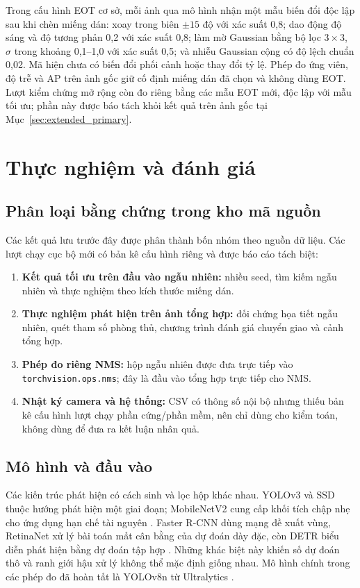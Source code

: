 \documentclass[a4paper,fleqn]{cas-dc}
\begin{document}
Trong cấu hình EOT cơ sở, mỗi ảnh qua mô hình nhận một mẫu biến đổi độc lập sau khi chèn miếng dán: xoay trong biên $\pm15$ độ với xác suất 0,8; dao động độ sáng và độ tương phản 0,2 với xác suất 0,8; làm mờ Gaussian bằng bộ lọc $3\times3$, $\sigma$ trong khoảng 0,1--1,0 với xác suất 0,5; và nhiễu Gaussian cộng có độ lệch chuẩn 0,02. Mã hiện chưa có biến đổi phối cảnh hoặc thay đổi tỷ lệ. Phép đo ứng viên, độ trễ và AP trên ảnh gốc giữ cố định miếng dán đã chọn và không dùng EOT. Lượt kiểm chứng mở rộng còn đo riêng bằng các mẫu EOT mới, độc lập với mẫu tối ưu; phần này được báo tách khỏi kết quả trên ảnh gốc tại Mục~\ref{sec:extended_primary}.

\section{Thực nghiệm và đánh giá}

\subsection{Phân loại bằng chứng trong kho mã nguồn}

Các kết quả lưu trước đây được phân thành bốn nhóm theo nguồn dữ liệu. Các lượt chạy cục bộ mới có bản kê cấu hình riêng và được báo cáo tách biệt:

\begin{enumerate}[leftmargin=*]
    \item \textbf{Kết quả tối ưu trên đầu vào ngẫu nhiên:} nhiều seed, tìm kiếm ngẫu nhiên và thực nghiệm theo kích thước miếng dán.
    \item \textbf{Thực nghiệm phát hiện trên ảnh tổng hợp:} đối chứng họa tiết ngẫu nhiên, quét tham số phòng thủ, chương trình đánh giá chuyển giao và cảnh tổng hợp.
    \item \textbf{Phép đo riêng NMS:} hộp ngẫu nhiên được đưa trực tiếp vào \texttt{torchvision.ops.nms}; đây là đầu vào tổng hợp trực tiếp cho NMS.
    \item \textbf{Nhật ký camera và hệ thống:} CSV có thông số nội bộ nhưng thiếu bản kê cấu hình lượt chạy phần cứng/phần mềm, nên chỉ dùng cho kiểm toán, không dùng để đưa ra kết luận nhân quả.
\end{enumerate}

\subsection{Mô hình và đầu vào}

Các kiến trúc phát hiện có cách sinh và lọc hộp khác nhau. YOLOv3 và SSD thuộc hướng phát hiện một giai đoạn; MobileNetV2 cung cấp khối tích chập nhẹ cho ứng dụng hạn chế tài nguyên \cite{yolov3,mobilenetv2,ssd2015}. Faster R-CNN dùng mạng đề xuất vùng, RetinaNet xử lý bài toán mất cân bằng của dự đoán dày đặc, còn DETR biểu diễn phát hiện bằng dự đoán tập hợp \cite{faster2015,retina2017,detr2020}. Những khác biệt này khiến số dự đoán thô và ranh giới hậu xử lý không thể mặc định giống nhau. Mô hình chính trong các phép đo đã hoàn tất là YOLOv8n từ Ultralytics \cite{yolov8docs}.
\end{document}
